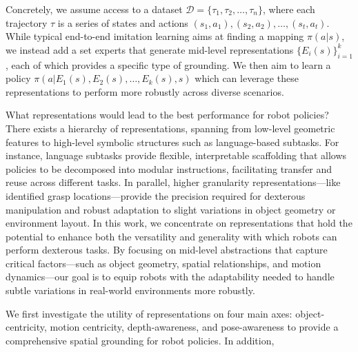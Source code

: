 \documentclass[conference,dvipsnames]{IEEEtran}
\begin{document}
Concretely, we assume access to a dataset $\mathcal{D} = \{\tau_{1}, \tau_{2}, \ldots, \tau_{n}\}$, where each trajectory $\tau$ is a series of states and actions $(s_{1}, a_{1}), (s_{2}, a_{2}), \ldots, (s_{t}, a_{t})$. While typical end-to-end imitation learning aims at finding a mapping $\pi(a|s)$, we instead add a set experts that generate mid-level representations $\{E_{i}(s)\}_{i=1}^{k}$, each of which provides a specific type of grounding. We then aim to learn a policy $\pi(a|E_{1}(s), E_{2}(s), \ldots, E_{k}(s), s)$ which can leverage these representations to perform more robustly across diverse scenarios.

What representations would lead to the best performance for robot policies? There exists a hierarchy of representations, spanning from low-level geometric features to high-level symbolic structures such as language-based subtasks. For instance, language subtasks provide flexible, interpretable scaffolding that allows policies to be decomposed into modular instructions, facilitating transfer and reuse across different tasks. In parallel, higher granularity representations—like identified grasp locations—provide the precision required for dexterous manipulation and robust adaptation to slight variations in object geometry or environment layout. In this work, we concentrate on representations that hold the potential to enhance both the versatility and generality with which robots can perform dexterous tasks. By focusing on mid-level abstractions that capture critical factors—such as object geometry, spatial relationships, and motion dynamics—our goal is to equip robots with the adaptability needed to handle subtle variations in real-world environments more robustly.

We first investigate the utility of representations on four main axes: object-centricity, motion centricity, depth-awareness, and pose-awareness to provide a comprehensive spatial grounding for robot policies. In addition,  
\end{document}
